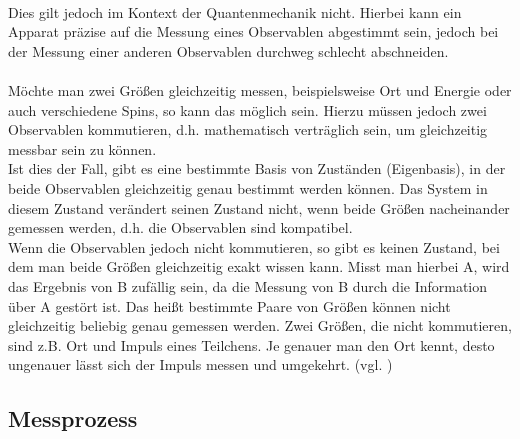 \\
Dies gilt jedoch im Kontext der Quantenmechanik nicht. Hierbei kann ein Apparat präzise auf die Messung eines Observablen abgestimmt sein, jedoch bei der Messung einer anderen Observablen durchweg schlecht abschneiden. \\ 
\\
Möchte man zwei Größen gleichzeitig messen, beispielsweise Ort und Energie oder auch verschiedene Spins, so kann das möglich sein. Hierzu müssen jedoch zwei Observablen kommutieren, d.h. mathematisch verträglich sein, um gleichzeitig messbar sein zu können. \\
Ist dies der Fall, gibt es eine bestimmte Basis von Zuständen (Eigenbasis), in der beide Observablen gleichzeitig genau bestimmt werden können. Das System in diesem Zustand verändert seinen Zustand nicht, wenn beide Größen nacheinander gemessen werden, d.h. die Observablen sind kompatibel. \\
Wenn die Observablen jedoch nicht kommutieren, so gibt es keinen Zustand, bei dem man beide Größen gleichzeitig exakt wissen kann. Misst man hierbei A, wird das Ergebnis von B zufällig sein, da die Messung von B durch die Information über A gestört ist.
Das heißt bestimmte Paare von Größen können nicht gleichzeitig beliebig genau gemessen werden. 
Zwei Größen, die nicht kommutieren, sind z.B. Ort und Impuls eines Teilchens. Je genauer man den Ort kennt, desto ungenauer lässt sich der Impuls messen und umgekehrt. 
(vgl. \cite[Ch. 1.9.3]{kasirajan_fundamentals_2021})

\subsection{Messprozess}
\label{subsec: Messprozess}

